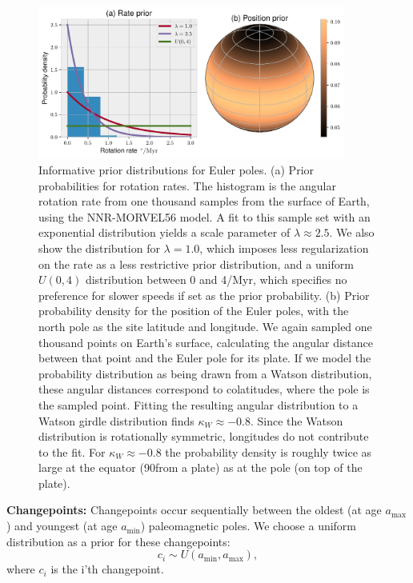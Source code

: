 \documentclass[11pt,letterpaper]{article}
\begin{document}
\begin{figure}
\centering
\includegraphics[width=0.9\textwidth]{fig_euler_pole_prior.pdf}
\caption[Informative prior distributions for Euler poles]{Informative prior distributions for Euler poles. (a) Prior probabilities for rotation rates. The histogram is the angular rotation rate from one thousand samples from the surface of Earth, using the NNR-MORVEL56 model. A fit to this sample set with an exponential distribution yields a scale parameter of $\lambda \approx 2.5$. We also show the distribution for $\lambda = 1.0$, which imposes less regularization on the rate as a less restrictive prior distribution, and a uniform $U(0,4)$ distribution between 0 and 4\textdegree/Myr, which specifies no preference for slower speeds if set as the prior probability. (b) Prior probability density for the position of the Euler poles, with the north pole as the site latitude and longitude.  We again sampled one thousand points on Earth's surface, calculating the angular distance between that point and the Euler pole for its plate.  If we model the probability distribution as being drawn from a Watson distribution, these angular distances correspond to colatitudes, where the pole is the sampled point.  Fitting the resulting angular distribution to a Watson girdle distribution finds $\kappa_W \approx -0.8$. Since the Watson distribution is rotationally symmetric, longitudes do not contribute to the fit. For $\kappa_W \approx -0.8$ the probability density is roughly twice as large at the equator (90\textdegree from a plate) as at the pole (on top of the plate).}
\label{fig:euler_pole_prior}
\end{figure}

\textbf{Changepoints:} 
Changepoints occur sequentially between the oldest (at age $a_\mathrm{max}$) and youngest (at age $a_\mathrm{min}$) paleomagnetic poles. We choose a uniform distribution as a prior for these changepoints:
\begin{equation}
c_i \sim U( a_\mathrm{min}, a_\mathrm{max}),
\end{equation}
where $c_i$ is the i'th changepoint.
\end{document}
